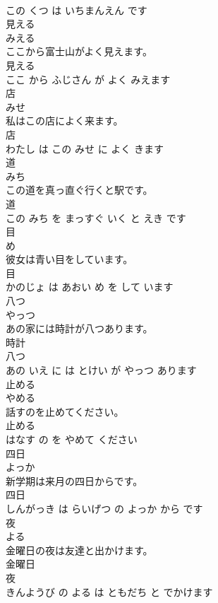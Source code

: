 \documentclass[8pt]{extreport}
\begin{document}
\begin{CJK}{UTF8}{min}
\\	この くつ は いちまんえん です			
\\	見える	
\\	みえる			
\\	ここから富士山がよく見えます。	
\\	見える 
\\	ここ から ふじさん が よく みえます			
\\	店	
\\	みせ			
\\	私はこの店によく来ます。	
\\	店 
\\	わたし は この みせ に よく きます			
\\	道	
\\	みち			
\\	この道を真っ直ぐ行くと駅です。	
\\	道 
\\	この みち を まっすぐ いく と えき です			
\\	目	
\\	め			
\\	彼女は青い目をしています。	
\\	目 
\\	かのじょ は あおい め を して います			
\\	八つ	
\\	やっつ			
\\	あの家には時計が八つあります。	
\\	時計 
\\	八つ 
\\	あの いえ に は とけい が やっつ あります			
\\	止める	
\\	やめる			
\\	話すのを止めてください。	
\\	止める 
\\	はなす の を やめて ください			
\\	四日	
\\	よっか			
\\	新学期は来月の四日からです。	
\\	四日 
\\	しんがっき は らいげつ の よっか から です			
\\	夜	
\\	よる			
\\	金曜日の夜は友達と出かけます。	
\\	金曜日 
\\	夜 
\\	きんようび の よる は ともだち と でかけます			

\end{CJK}
\end{document}
